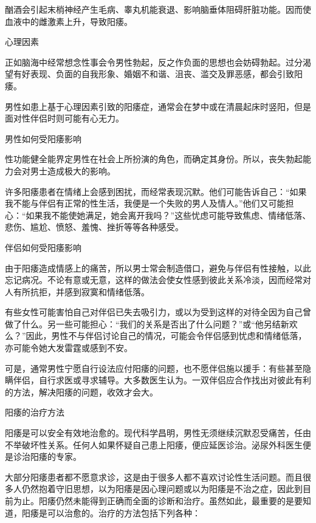 \documentclass[12pt,UTF8,openany]{ctexbook}
\begin{document}
酗酒会引起末梢神经产生毛病、睾丸机能衰退、影响脑垂体阻碍肝脏功能。因而使血液中的雌激素上升，导致阳痿。

心理因素

正如脑海中经常想念性事会令男性勃起，反之作负面的思想也会妨碍勃起。过分渴望有好表现、负面的自我形象、婚姻不和谐、沮丧、滥交及罪恶感，都会引致阳痿。

男性如患上基于心理因素引致的阳痿症，通常会在梦中或在清晨起床时竖阳，但是面对性伴侣时则可能有心无力。





男性如何受阳痿影响


性功能健全能界定男性在社会上所扮演的角色，而确定其身份。所以，丧失勃起能力会对男士造成极大的影响。

许多阳痿患者在情绪上会感到困扰，而经常表现沉默。他们可能告诉自己：“如果我不能与伴侣有正常的性生活，我便是一个失败的男人及情人。”他们又可能担心：“如果我不能使她满足，她会离开我吗？”这些忧虑可能导致焦虑、情绪低落、悲伤、尴尬、愤怒、羞愧、挫折等等各种感受。





伴侣如何受阳痿影响


由于阳痿造成情感上的痛苦，所以男士常会制造借口，避免与伴侣有性接触，以此忘记病况。不论有意或无意，这样的做法会使女性感到彼此关系冷淡，因而经常对人有所抗拒，并感到寂寞和情绪低落。

有些女性可能害怕自己对伴侣已失去吸引力，或以为受到这样的对待全因为自己曾做了什么。另一些可能担心：“我们的关系是否出了什么问题？”或“他另结新欢么？”因此，男性不与伴侣讨论自己的情况，可能会令伴侣感到忧虑和情绪低落，亦可能令她大发雷霆或感到不安。

可是，通常男性宁愿自行设法应付阳痿的问题，也不愿伴侣施以援手：有些甚至隐瞒伴侣，自行求医或寻求辅导。大多数医生认为。一双伴侣应合作找出对彼此有利的方法，解决阳痿的问题，收效才会大。





阳痿的治疗方法


阳痿是可以安全有效地治愈的。现代科学昌明，男性无须继续沉默忍受痛苦，任由不举破坏性关系。任何人如果怀疑自己患上阳痿，便应延医诊治。泌尿外科医生便是诊治阳痿的专家。

大部分阳痿患者都不愿意求诊，这是由于很多人都不喜欢讨论性生活问题。而且很多人仍然抱着守旧思想，以为阳痿是因心理问题或以为阳痿是不治之症，因此到目前为止。阳痿仍然未能得到正确而全面的诊断和治疗。虽然如此，最重要的是要知道，阳痿是可以治愈的。治疗的方法包括下列各种：
\end{document}

